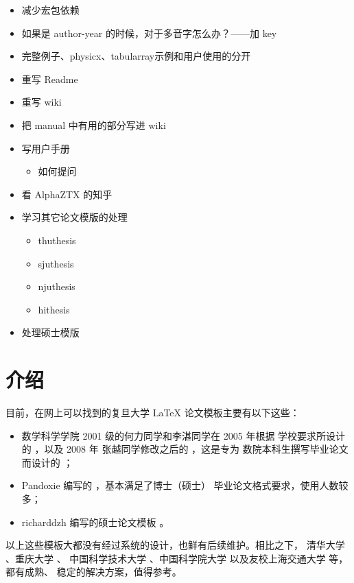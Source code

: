 \documentclass{ccnudoc}
\begin{document}
\begin{itemize}
  \item 减少宏包依赖
  \item 如果是 author-year 的时候，对于多音字怎么办？——加 key
  \item 完整例子、physicx、tabularray示例和用户使用的分开
  \item 重写 Readme
  \item 重写 wiki
  \item 把 manual 中有用的部分写进 wiki
  \item 写用户手册
    \begin{itemize}
      \item 如何提问
    \end{itemize}
  \item 看 AlphaZTX 的知乎
  \item 学习其它论文模版的处理
    \begin{itemize}
      \item thuthesis
      \item sjuthesis
      \item njuthesis
      \item hithesis
    \end{itemize}
  \item 处理硕士模版
\end{itemize}

\section{介绍}

目前，在网上可以找到的复旦大学 \LaTeX{} 论文模板主要有以下这些：
\begin{itemize}
  \item 数学科学学院 2001 级的何力同学和李湛同学在 2005 年根据
    学校要求所设计的 ，以及 2008 年
    张越同学修改之后的 ，这是专为
    数院本科生撰写毕业论文而设计的
    \cite{数院毕业论文格式,数院毕业论文格式更新}；
  \item Pandoxie 编写的 
    \cite{pandoxie2014fduthesislatex}，基本满足了博士（硕士）
    毕业论文格式要求，使用人数较多；
  \item richarddzh 编写的硕士论文模板 
    \cite{richard2016fudanthesis}。
\end{itemize}
以上这些模板大都没有经过系统的设计，也鲜有后续维护。相比之下，
清华大学 \cite{thuthesis}、重庆大学 \cite{cquthesis}、
中国科学技术大学 \cite{ustcthesis}、中国科学院大学 \cite{ucasthesis}
以及友校上海交通大学 \cite{sjtuthesis}等，都有成熟、
稳定的解决方案，值得参考。
\end{document}
